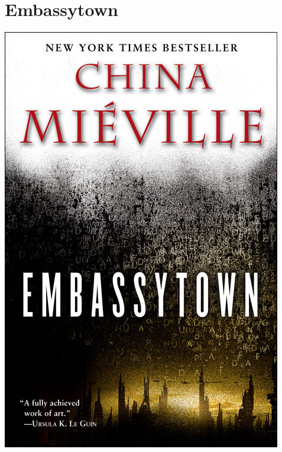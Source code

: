 \documentclass{tufte-handout}
\makeatletter
\newcommand{\varcaption}[2][0pt]{%
  \gsetlength{\@tufte@caption@vertical@offset}{-#1}%
  \gdef\@tufte@stored@varcaption{#2}%
}
\gdef\@tufte@stored@varcaption{} %
\makeatother
\begin{document}
\section*{Embassytown}
\begin{marginfigure}[9\baselineskip]
   \includegraphics[width=\linewidth]{images/embassytown.jpg}
   \varcaption{\href{https://www.penguinrandomhouse.com/books/206876/embassytown-by-china-mieville/9780345524508/}{Publisher Link}, \href{https://www.amazon.com/Embassytown-Novel-China-Miéville/dp/0345524500/}{Amazon Link}}
\end{marginfigure}
\end{document}
